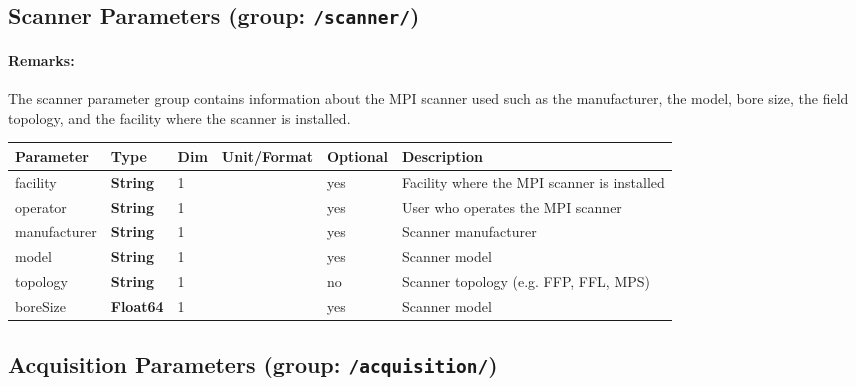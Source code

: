 \documentclass[landscape,a4paper]{article} %
\newcommand{\inl}[1]{\lstinline[columns=fixed]{#1}}
\newcommand{\inltab}[1]{{\ttfamily\bfseries\color{blue}#1}}
\newcommand{\inlvar}[1]{{\ttfamily#1}}
\begin{document}
\subsection{Scanner Parameters (group: \inl{/scanner/})}

\begin{multicols}{2}
\paragraph{Remarks:} The scanner parameter group contains information about the MPI scanner used such as the manufacturer, the model, bore size, the field topology, and the facility where the scanner is installed.
\end{multicols}

\noindent \begin{tabularx}{\columnwidth}{lllllX}
\noindent \textbf{Parameter} & \textbf{Type} & \textbf{Dim} & \textbf{Unit/Format} & \textbf{Optional} & \textbf{Description} \\ \hline 
\inlvar{facility} & \inltab{String} & 1 & & yes & Facility where the MPI scanner is installed \\ \hline 
\inlvar{operator} & \inltab{String} & 1 & & yes & User who operates the MPI scanner \\ \hline 
\inlvar{manufacturer} & \inltab{String} & 1 & & yes & Scanner manufacturer \\ \hline 
\inlvar{model} & \inltab{String} & 1 & & yes & Scanner model \\ \hline 
\inlvar{topology} & \inltab{String} & 1 & & no & Scanner topology (e.g. FFP, FFL, MPS)\\ \hline 
\inlvar{boreSize} & \inltab{Float64} & 1 & & yes & Scanner model \\ \hline 
\end{tabularx}


\subsection{Acquisition Parameters (group: \inl{/acquisition/})}
\end{document}
